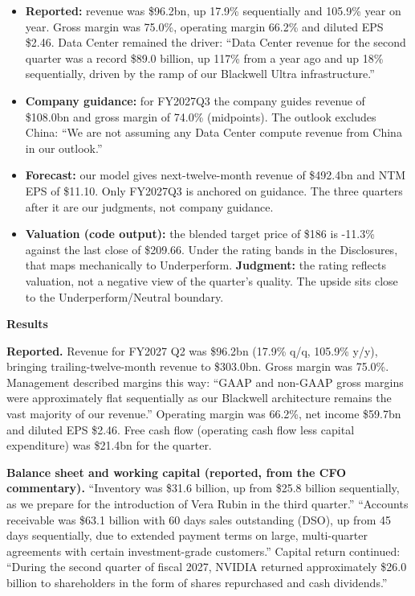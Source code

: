 \documentclass[a4paper,10pt]{article}
\begin{document}
\begin{itemize}\setlength{\itemsep}{1pt}
\item \textbf{Reported:} revenue was \$96.2bn, up 17.9\% sequentially and 105.9\% year on year. Gross margin was 75.0\%, operating margin 66.2\% and diluted EPS \$2.46. Data Center remained the driver: “Data Center revenue for the second quarter was a record \$89.0 billion, up 117\% from a year ago and up 18\% sequentially, driven by the ramp of our Blackwell Ultra infrastructure.”
\item \textbf{Company guidance:} for FY2027Q3 the company guides revenue of \$108.0bn and gross margin of 74.0\% (midpoints). The outlook excludes China: “We are not assuming any Data Center compute revenue from China in our outlook.”
\item \textbf{Forecast:} our model gives next-twelve-month revenue of \$492.4bn and NTM EPS of \$11.10. Only FY2027Q3 is anchored on guidance. The three quarters after it are our judgments, not company guidance.
\item \textbf{Valuation (code output):} the blended target price of \$186 is -11.3\% against the last close of \$209.66. Under the rating bands in the Disclosures, that maps mechanically to Underperform. \textbf{Judgment:} the rating reflects valuation, not a negative view of the quarter's quality. The upside sits close to the Underperform/Neutral boundary.
\end{itemize}

\par\smallskip\textbf{\color{MemoBlue}Results}\par

\textbf{Reported.} Revenue for FY2027 Q2 was \$96.2bn (17.9\% q/q, 105.9\% y/y), bringing trailing-twelve-month revenue to \$303.0bn. Gross margin was 75.0\%. Management described margins this way: “GAAP and non-GAAP gross margins were approximately flat sequentially as our Blackwell architecture remains the vast majority of our revenue.” Operating margin was 66.2\%, net income \$59.7bn and diluted EPS \$2.46. Free cash flow (operating cash flow less capital expenditure) was \$21.4bn for the quarter.

\textbf{Balance sheet and working capital (reported, from the CFO commentary).} “Inventory was \$31.6 billion, up from \$25.8 billion sequentially, as we prepare for the introduction of Vera Rubin in the third quarter.” “Accounts receivable was \$63.1 billion with 60 days sales outstanding (DSO), up from 45 days sequentially, due to extended payment terms on large, multi-quarter agreements with certain investment-grade customers.” Capital return continued: “During the second quarter of fiscal 2027, NVIDIA returned approximately \$26.0 billion to shareholders in the form of shares repurchased and cash dividends.”
\end{document}
